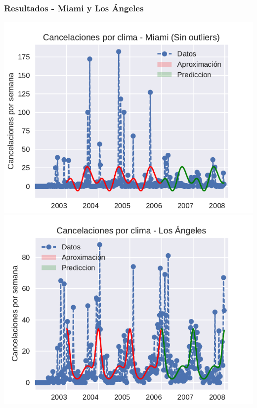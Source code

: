 \documentclass{beamer}
\begin{document}

\begin{frame}

\frametitle{Resultados - Miami y Los Ángeles}


{\centering
\includegraphics[scale=0.5]{diapos/imagenes/cancelacionesClimaMiamiPrediccionV1SINOUTS.pdf}
\includegraphics[scale=0.5]{diapos/imagenes/cancelacionesClimaLosAngelesPrediccionV1.pdf}
}

\end{frame}
\end{document}
